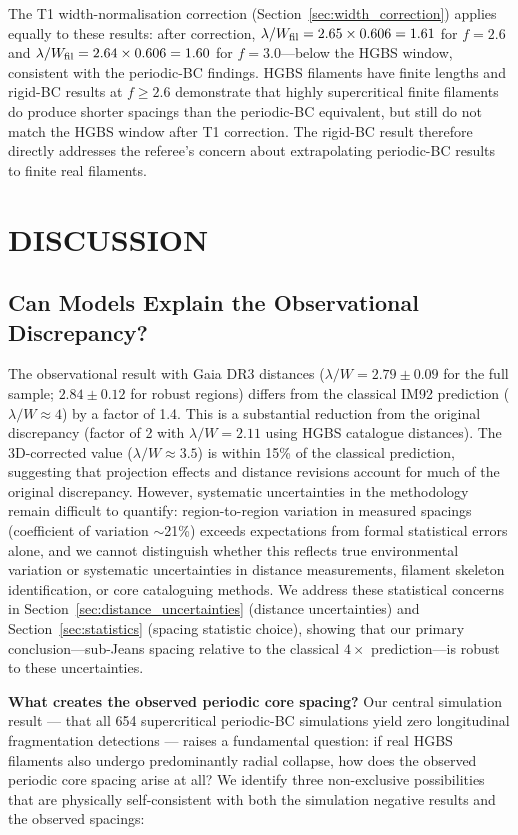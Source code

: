 \documentclass[twoside,twocolumn]{mnras}
\begin{document}
The T1 width-normalisation correction (Section~\ref{sec:width_correction}) applies equally to these results: after correction, $\lambda/W_{\rm fil} = 2.65 \times 0.606 = 1.61$ for $f = 2.6$ and $\lambda/W_{\rm fil} = 2.64 \times 0.606 = 1.60$ for $f = 3.0$---below the HGBS window, consistent with the periodic-BC findings. HGBS filaments have finite lengths and rigid-BC results at $f \geq 2.6$ demonstrate that highly supercritical finite filaments do produce shorter spacings than the periodic-BC equivalent, but still do not match the HGBS window after T1 correction. The rigid-BC result therefore directly addresses the referee's concern about extrapolating periodic-BC results to finite real filaments.

\section{DISCUSSION}
\label{sec:discussion}

\subsection{Can Models Explain the Observational Discrepancy?}

The observational result with Gaia DR3 distances ($\lambda/W = 2.79 \pm 0.09$ for the full sample; $2.84 \pm 0.12$ for robust regions) differs from the classical IM92 prediction ($\lambda/W \approx 4$) by a factor of 1.4. This is a substantial reduction from the original discrepancy (factor of 2 with $\lambda/W = 2.11$ using HGBS catalogue distances). The 3D-corrected value ($\lambda/W \approx 3.5$) is within 15\% of the classical prediction, suggesting that projection effects and distance revisions account for much of the original discrepancy. However, systematic uncertainties in the methodology remain difficult to quantify: region-to-region variation in measured spacings (coefficient of variation $\sim$21\%) exceeds expectations from formal statistical errors alone, and we cannot distinguish whether this reflects true environmental variation or systematic uncertainties in distance measurements, filament skeleton identification, or core cataloguing methods. We address these statistical concerns in Section~\ref{sec:distance_uncertainties} (distance uncertainties) and Section~\ref{sec:statistics} (spacing statistic choice), showing that our primary conclusion—sub-Jeans spacing relative to the classical $4\times$ prediction—is robust to these uncertainties.

\textbf{What creates the observed periodic core spacing?} Our central simulation result — that all 654 supercritical periodic-BC simulations yield zero longitudinal fragmentation detections — raises a fundamental question: if real HGBS filaments also undergo predominantly radial collapse, how does the observed periodic core spacing arise at all? We identify three non-exclusive possibilities that are physically self-consistent with both the simulation negative results and the observed spacings:
\end{document}

